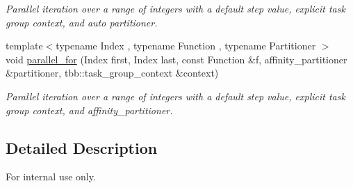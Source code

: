 \begin{DoxyCompactItemize}
\begin{DoxyCompactList}\small\item\em Parallel iteration over a range of integers with a default step value, explicit task group context, and auto partitioner. \end{DoxyCompactList}\item 
\hypertarget{namespacetbb_1_1strict__ppl_a60adf8c138aa0d379b6bf98f39170f47}{}{\footnotesize template$<$typename Index , typename Function , typename Partitioner $>$ }\\void \hyperlink{namespacetbb_1_1strict__ppl_a60adf8c138aa0d379b6bf98f39170f47}{parallel\+\_\+for} (Index first, Index last, const Function \&f, affinity\+\_\+partitioner \&partitioner, tbb\+::task\+\_\+group\+\_\+context \&context)\label{namespacetbb_1_1strict__ppl_a60adf8c138aa0d379b6bf98f39170f47}

\begin{DoxyCompactList}\small\item\em Parallel iteration over a range of integers with a default step value, explicit task group context, and affinity\+\_\+partitioner. \end{DoxyCompactList}\end{DoxyCompactItemize}



\subsection{Detailed Description}
For internal use only. 
